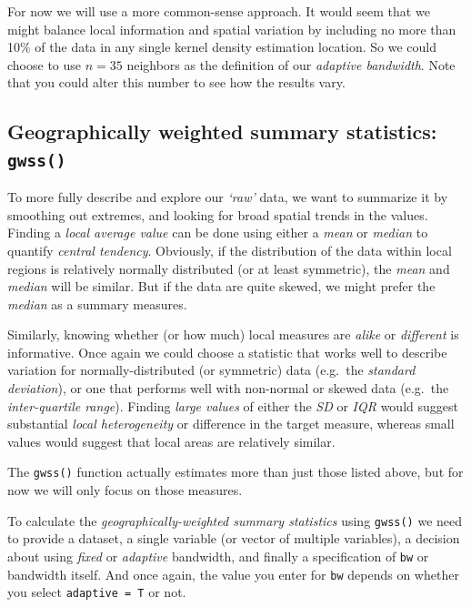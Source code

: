 \documentclass[
]{book}
\begin{document}
For now we will use a more common-sense approach. It would seem that we might balance local information and spatial variation by including no more than 10\% of the data in any single kernel density estimation location. So we could choose to use \(n=35\) neighbors as the definition of our \emph{adaptive bandwidth}. Note that you could alter this number to see how the results vary.

\hypertarget{geographically-weighted-summary-statistics-gwss}{%
\subsection{\texorpdfstring{Geographically weighted summary statistics: \texttt{gwss()}}{Geographically weighted summary statistics: gwss()}}\label{geographically-weighted-summary-statistics-gwss}}

To more fully describe and explore our \emph{`raw'} data, we want to summarize it by smoothing out extremes, and looking for broad spatial trends in the values. Finding a \emph{local average value} can be done using either a \emph{mean} or \emph{median} to quantify \emph{central tendency}. Obviously, if the distribution of the data within local regions is relatively normally distributed (or at least symmetric), the \emph{mean} and \emph{median} will be similar. But if the data are quite skewed, we might prefer the \emph{median} as a summary measures.

Similarly, knowing whether (or how much) local measures are \emph{alike} or \emph{different} is informative. Once again we could choose a statistic that works well to describe variation for normally-distributed (or symmetric) data (e.g.~the \emph{standard deviation}), or one that performs well with non-normal or skewed data (e.g.~the \emph{inter-quartile range}). Finding \emph{large values} of either the \emph{SD} or \emph{IQR} would suggest substantial \emph{local heterogeneity} or difference in the target measure, whereas small values would suggest that local areas are relatively similar.

The \texttt{gwss()} function actually estimates more than just those listed above, but for now we will only focus on those measures.

To calculate the \emph{geographically-weighted summary statistics} using \texttt{gwss()} we need to provide a dataset, a single variable (or vector of multiple variables), a decision about using \emph{fixed} or \emph{adaptive} bandwidth, and finally a specification of \texttt{bw} or bandwidth itself. And once again, the value you enter for \texttt{bw} depends on whether you select \texttt{adaptive\ =\ T} or not.
\end{document}
